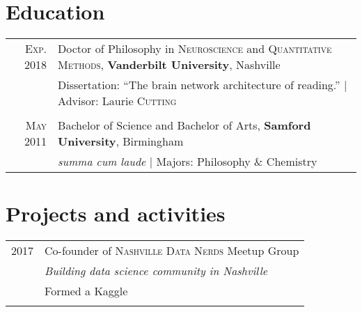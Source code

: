 \documentclass[a4paper,10pt]{article}
\begin{document}
\section{Education}
\begin{tabular}{rl}	

    \textsc{Exp.} 2018 & Doctor of Philosophy in \textsc{Neuroscience} and \textsc{Quantitative Methods}, \textbf{Vanderbilt University}, Nashville\\
    & Dissertation: ``The brain network architecture of reading.'' | \small Advisor: Laurie \textsc{Cutting}\\\\
    
    \textsc{May} 2011 & Bachelor of Science and Bachelor of Arts, \textbf{Samford University}, Birmingham\\
    & \small\emph{summa cum laude} | Majors: Philosophy \& Chemistry\\

\end{tabular}


\section{Projects and activities}
\begin{tabular}{rl}
    \textsc{2017} & Co-founder of \textsc{Nashville Data Nerds} Meetup Group \\
    & \emph{Building data science community in Nashville}\\
    & \footnotesize{Formed a Kaggle }\\
    \multicolumn{2}{c}{} \\



\end{tabular}
\end{document}
